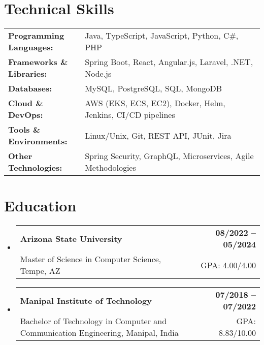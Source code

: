 \documentclass[letterpaper,11pt]{article}
\makeatletter
\newcommand{\educationSubheading}[4]{
  \vspace{-2pt}\item
    \begin{tabular*}{1.0\textwidth}[t]{l@{\extracolsep{\fill}}r}
      \textbf{\small #1} & \textbf{\small #2} \\
      {\small#3} & {\small #4} \\
    \end{tabular*}\vspace{-7pt}
}
\newcommand{\resumeSubHeadingListStart}{\begin{itemize}[leftmargin=0pt, label={}]}
\newcommand{\resumeSubHeadingListEnd}{\end{itemize}}
\makeatother
\begin{document}
\section{Technical Skills}
        \vspace{-14pt}
        \begin{table}[h]
            \footnotesize
            \begin{tabular}{p{0.3\linewidth} p{0.7\linewidth}}
                \textbf{Programming Languages:} & Java, TypeScript, JavaScript, Python, C\#, PHP \\
                \textbf{Frameworks \& Libraries:} & Spring Boot, React, Angular.js, Laravel, .NET, Node.js \\
                \textbf{Databases:} & MySQL, PostgreSQL, SQL, MongoDB \\
                \textbf{Cloud \& DevOps:} & AWS (EKS, ECS, EC2), Docker, Helm, Jenkins, CI/CD pipelines \\
                \textbf{Tools \& Environments:} & Linux/Unix, Git, REST API, JUnit, Jira \\
                \textbf{Other Technologies:} & Spring Security, GraphQL, Microservices, Agile Methodologies \\
            \end{tabular}
        \end{table}

 \vspace{-15pt}

\section{Education}
  \resumeSubHeadingListStart
    \educationSubheading
      {Arizona State University}{08/2022 -- 05/2024}
      {Master of Science in Computer Science, Tempe, AZ}{GPA: 4.00/4.00}

    \educationSubheading
      {Manipal Institute of Technology}{07/2018 -- 07/2022}
      {Bachelor of Technology in Computer and Communication Engineering, Manipal, India}{GPA: 8.83/10.00}
  \resumeSubHeadingListEnd
\end{document}
